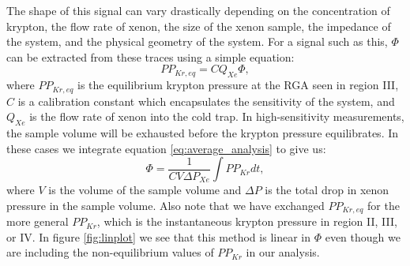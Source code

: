 \documentclass[12pt]{article}
\begin{document}
The shape of this signal can vary drastically depending on the concentration of krypton, the flow rate of xenon, the size of the xenon sample, the impedance of the system, and the physical geometry of the system. For a signal such as this, $\Phi$ can be extracted from these traces using a simple equation:
\begin{equation}
\label{eq:average_analysis}
PP_{Kr,eq}=CQ_{Xe}\Phi,
\end{equation}
where $PP_{Kr,eq}$ is the equilibrium krypton pressure at the RGA seen in region III, $C$ is a calibration constant which encapsulates the sensitivity of the system, and $Q_{Xe}$ is the flow rate of xenon into the cold trap. In high-sensitivity measurements, the sample volume will be exhausted before the krypton pressure equilibrates. In these cases we integrate equation \ref{eq:average_analysis} to give us:
\begin{equation}
\label{eq:int_analysis}
\Phi = \frac{1}{CV\Delta P_{Xe}}\int PP_{Kr}dt,
\end{equation}
where $V$ is the volume of the sample volume and $\Delta P$ is the total drop in xenon pressure in the sample volume. Also note that we have exchanged $PP_{Kr,eq}$ for the more general $PP_{Kr}$, which is the instantaneous krypton pressure in region II, III, or IV. In figure \ref{fig:linplot} we see that this method is linear in $\Phi$ even though we are including the non-equilibrium values of $PP_{Kr}$ in our analysis.
\end{document}
